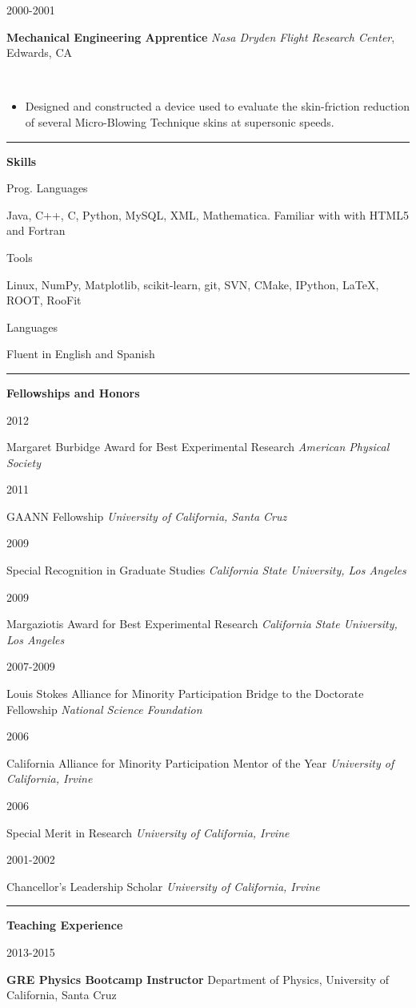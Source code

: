 \documentclass[11pt]{article}
\newcommand{\cvsection}[1] {
    \noindent
    \textcolor{indigodye}{\rule{.15\textwidth}{.1in} \hspace{0.01 \textwidth} \textbf{\Large{#1}}} \newline
}
\newcommand{\experienceentry}[5] { 
    \noindent
    \begin{minipage}[t]{0.15\textwidth} \begin{flushright} #1 \end{flushright} \end{minipage} \hspace{0.01\textwidth}
    \begin{minipage}[t]{0.84\textwidth} 
        \textbf{#2} \newline
        \emph{#3}, #4 
    \end{minipage} \\[0.01pt]
    #5 \vspace{11pt}
}
\newcommand{\skillsentry}[2] { 
    \noindent
    \begin{minipage}[t]{0.15\textwidth} \begin{flushright} #1 \end{flushright} \end{minipage} \hspace{0.01\textwidth}
    \begin{minipage}[t]{0.84\textwidth} #2 \end{minipage}
}
\newcommand{\awardentry}[3] { 
    \noindent
    \begin{minipage}[t]{0.15\textwidth} \begin{flushright} #1 \end{flushright} \end{minipage} \hspace{0.01\textwidth}
    \begin{minipage}[t]{0.84\textwidth} #2 \hfill \newline
        \emph{#3} 
    \end{minipage}
}
\newcommand{\teachingentry}[4] { 
    \noindent
    \begin{minipage}[t]{0.15\textwidth} \begin{flushright} #1 \end{flushright} \end{minipage} \hspace{0.01\textwidth}
    \begin{minipage}[t]{0.84\textwidth}
        \textbf{#2} \newline
        #3  
    \end{minipage} \\[0.01pt]
    #4 \vspace{11pt}
}
\begin{document}
        \experienceentry{2000-2001}
                        {Mechanical Engineering Apprentice}
                        {Nasa Dryden Flight Research Center}
                        {Edwards, CA}
                        {
                            \begin{itemize}[label=\textcolor{indigodye}{$\circ$}, noitemsep, nolistsep, leftmargin=0.19\textwidth]
                                \item Designed and constructed a device used to evaluate the skin-friction reduction 
                                      of several Micro-Blowing Technique skins at supersonic speeds. 
                            \end{itemize}
                        } 
    
    \cvsection{Skills}
        \skillsentry{Prog. Languages}{Java, C++, C, Python, MySQL, XML, Mathematica. Familiar with with HTML5 and Fortran}
        \skillsentry{Tools}{Linux, NumPy, Matplotlib, scikit-learn, git, SVN, CMake, IPython, \LaTeX, ROOT, RooFit}
        \skillsentry{Languages}{Fluent in English and Spanish}

    \cvsection{Fellowships and Honors}
        \awardentry{2012}{Margaret Burbidge Award for Best Experimental Research}{American Physical Society} 
        \awardentry{2011}{GAANN Fellowship}{University of California, Santa Cruz}
        \awardentry{2009}{Special Recognition in Graduate Studies}
                         {California State University, Los Angeles}
        \awardentry{2009}{Margaziotis Award for Best Experimental Research}
                         {California State University, Los Angeles}
        \awardentry{2007-2009}{Louis Stokes Alliance for Minority Participation Bridge to the Doctorate Fellowship}
                              {National Science Foundation} 
        \awardentry{2006}{California Alliance for Minority Participation Mentor of the Year}
                         {University of California, Irvine}
        \awardentry{2006}{Special Merit in Research}
                         {University of California, Irvine}
        \awardentry{2001-2002}{Chancellor's Leadership Scholar}
                         {University of California, Irvine}

    \cvsection{Teaching Experience}
        \teachingentry{2013-2015}{GRE Physics Bootcamp Instructor}
                      {Department of Physics, University of California, Santa Cruz}
                      {}
\end{document}
